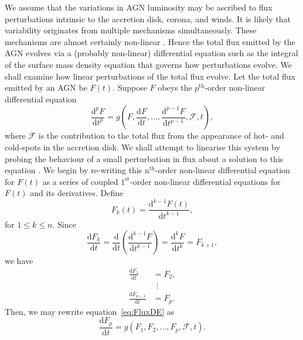 \documentclass[a4paper,fleqn,usenatbib]{mnras}
\begin{document}
We assume that the variations in AGN luminosity may be ascribed to flux perturbations intrinsic to the accretion disk, corona, and winds. It is likely that variability originates from multiple mechanisms simultaneously. These mechanisms are almost certainly non-linear \citep{UMV05}. Hence the total flux emitted by the AGN evolves via a (probably non-linear) differential equation such as the integral of the surface mass density equation \citep[see][eq. 4]{LightmanEardley74} that governs how perturbations evolve. We shall examine how linear perturbations of the total flux evolve. Let the total flux emitted by an AGN be $F(t)$. Suppose $F$ obeys the $p^{\mathrm{th}}$-order non-linear differential equation 
\begin{equation}\label{eq:FluxDE}
\frac{\mathrm{d}^{p}F}{\mathrm{d}t^{p}} = g(F,\frac{\mathrm{d}F}{\mathrm{d}t},\ldots,\frac{\mathrm{d}^{p-1}F}{\mathrm{d}t^{p-1}},\mathcal{F},t),
\end{equation}
where $\mathcal{F}$ is the contribution to the total flux from the appearance of hot- and cold-spots in the accretion disk. We shall attempt to linearise this system by probing the behaviour of a small perturbation in flux about a solution to this equation \citep{Wiberg,Stengel}. We begin by re-writing this n$^\mathrm{th}$-order non-linear differential equation for $F(t)$ as a series of coupled $1^\mathrm{st}$-order non-linear differential equations for $F(t)$ and its derivatives. Define
\begin{equation}\label{eq:GeneralRelationship}
F_{k}(t) = \frac{\mathrm{d}^{k-1}F(t)}{\mathrm{d}t^{k-1}},
\end{equation}
for $1 \leq k \leq n$. Since 
\begin{equation}\label{eq:Linearize}
\frac{\mathrm{d}F_{k}}{\mathrm{d}t} = \frac{\mathrm{d}}{\mathrm{d}t}\left(\frac{\mathrm{d}^{k-1}F}{\mathrm{d}t^{k-1}}\right) = \frac{\mathrm{d}^{k}F}{\mathrm{d}t^{k}} = F_{k+1},
\end{equation} we have 
\begin{equation}\label{eq:1stOrderSystem}
\begin{aligned}
\frac{\mathrm{d}F_{1}}{\mathrm{d}t} &= F_{2}, \\
&\ \ \vdots \\
\frac{\mathrm{d}F_{p-1}}{\mathrm{d}t} &= F_{p}.
\end{aligned}
\end{equation}
Then, we may rewrite equation~\eqref{eq:FluxDE} as
\begin{equation}\label{eq:1stOrderNonLinearDE}
\frac{\mathrm{d}F_{p}}{\mathrm{d}t} = g(F_{1},F_{2},\ldots,F_{p},\mathcal{F},t).
\end{equation}
\end{document}
